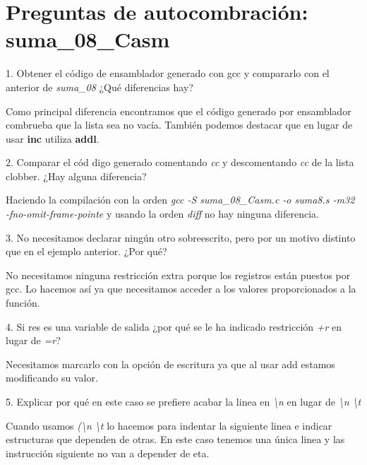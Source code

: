 \section*{Preguntas de autocombración: suma\_08\_Casm}

\begin{ejercicio}{1. Obtener el código de ensamblador generado con gcc
    y compararlo con el anterior de \textit{suma\_08} ¿Qué diferencias
    hay?}

  Como principal diferencia encontramos que el código generado por ensamblador combrueba que la lista sea no vacía. También podemos destacar que en lugar de usar \textbf{inc} utiliza \textbf{addl}.
\end{ejercicio}

\begin{ejercicio}{2. Comparar el cód digo generado comentando
    \textit{cc} y descomentando \textit{cc} de la lista clobber.  ¿Hay
    alguna diferencia?}
  
  Haciendo la compilación con la orden \textit{gcc -S suma\_08\_Casm.c
    -o suma8.s -m32 -fno-omit-frame-pointe} y usando la orden
  \textit{diff} no hay ninguna diferencia.
\end{ejercicio}

\begin{ejercicio}{3. No necesitamos declarar ningún otro sobreescrito, pero por un motivo distinto que en el ejemplo anterior. ¿Por qué?}

  No necesitamos ninguna restricción extra porque los registros están
  puestos por gcc. Lo hacemos así ya que necesitamos acceder a los
  valores proporcionados a la función.
  
\end{ejercicio}

\begin{ejercicio}{4. Si res es una variable de salida ¿por qué se le ha
    indicado restricción \textit{+r} en lugar de \textit{=r}?}

  Necesitamos marcarlo con la opción de escritura ya que al usar add
  estamos modificando su valor.
  
\end{ejercicio}

\begin{ejercicio}{5. Explicar por qué en este caso se prefiere acabar la linea en \textit{\textbackslash n} en lugar de \textit{\textbackslash n \textbackslash t}}

  Cuando usamos \textit{(\textbackslash n \textbackslash t} lo hacemos para indentar la siguiente
  linea e indicar estructuras que dependen de otras. En este caso
  tenemos una única linea y las instrucción siguiente no van a
  depender de eta.
  
\end{ejercicio}

